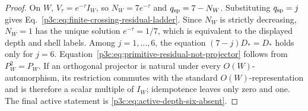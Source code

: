 \documentclass[12pt,a4paper]{article}
\begin{document}
\begin{proof}
On $W$, $V_\tau=e^{-\tau}I_W$, so
$N_W=7e^{-\tau}$ and
$q_{\rm sp}=7-N_W$.  Substituting $q_{\rm sp}=j$ gives
Eq.~\eqref{p3c:eq:finite-crossing-residual-ladder}.  Since $N_W$ is
strictly decreasing, $N_W=1$ has the unique solution $e^{-\tau}=1/7$,
which is equivalent to the displayed depth and shell labels.  Among
$j=1,\ldots,6$, the equation $(7-j)D_*=D_*$ holds only for $j=6$.
Equation~\eqref{p3c:eq:primitive-residual-not-projector} follows from
\(P_W^2=P_W\).  If an orthogonal projector is natural under every
\(O(W)\)-automorphism, its restriction commutes with the standard
\(O(W)\)-representation and is therefore a scalar multiple of \(I_W\);
idempotence leaves only zero and one.  The final active statement is
\eqref{p3c:eq:active-depth-six-absent}.
\end{proof}
\end{document}
